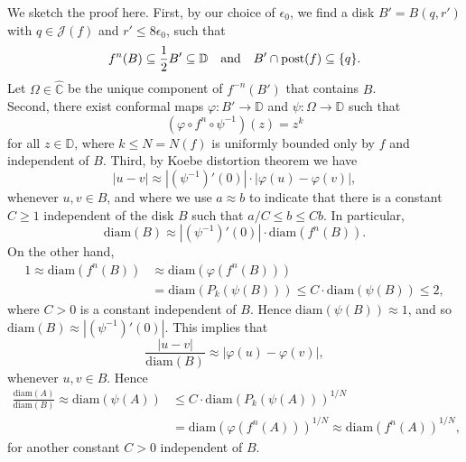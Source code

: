 \documentclass[12pt]{amsart}
\makeatletter
\newtheorem*{pf}{Proof}
\newcommand{\C}{\mathbb{C}}
\newcommand{\D}{\mathbb{D}}
\newcommand{\hC}{\widehat{\C}}
\newcommand{\sub}{\subseteq }
\newcommand{\J}{\mathcal{J}}
\newcommand{\co}{\colon}
\renewenvironment{pf}[1][\proofname]{%
  \par
  \pushQED{\qed}%
  \normalfont\topsep6\p@ \@plus6\p@ \trivlist
  \item[\hskip\labelsep\itshape
        \bfseries #1\@addpunct{:}]%
  \ignorespaces
}{%
  \popQED\endtrivlist
}
\makeatother
\begin{document}
\begin{pf}
We sketch the proof here. First, by our choice of $\epsilon_0$, 
we find a disk $B'=B(q,r')$ with $q\in \J(f)$ and $r'\leq 8\epsilon_0$, such that 
$$f^n(B)\sub \frac{1}{2}B'\sub \D \quad {\rm and} \quad B'\cap \mathrm{post}(f)\sub \{q\}.$$
Let $\Omega\in \hC$ be the unique component of $f^{-n}(B')$ that contains $B$.\\
Second, there exist conformal maps $\varphi\co B'\to \D$ and $\psi\co \Omega\to \D$ such that 
$$(\varphi\circ f^n\circ \psi^{-1})(z)=z^k$$
for all $z\in \D$, where $k\leq N=N(f)$ is uniformly bounded only by $f$ and independent of $B$. 
Third, 
by Koebe distortion theorem we have 
$$|u-v|\approx  \left\lvert (\psi^{-1})'(0)\right\rvert \cdot \left\lvert \varphi(u)-\varphi(v)\right\rvert, $$
whenever $u,v\in B$, and where we use $a\approx b$ to indicate that there is a constant $C\ge1$ independent of the disk $B$ such that $a/C\le b\le Cb$. In particular, 
$$\mathrm{diam}(B)\approx  \left\lvert (\psi^{-1})'(0)\right\rvert \cdot \mathrm{diam}(f^n(B)).$$
On the other hand, 
\begin{align*}
  1\approx  \mathrm{diam}(f^n(B))  &\approx  \mathrm{diam}(\varphi(f^n(B))) 
  \\& =\mathrm{diam}(P_k(\psi(B)))\le C\cdot \mathrm{diam}(\psi(B))\leq 2,
\end{align*}
where $C>0$ is a constant independent of $B$.
Hence $\mathrm{diam}(\psi(B))\approx  1$, and so $\mathrm{diam}(B)\approx \left\lvert (\psi^{-1})'(0)\right\rvert $.
This implies that 
$$\frac{|u-v|}{\mathrm{diam}(B)}\approx  \left\lvert \varphi(u)-\varphi(v)\right\rvert,$$
whenever $u,v\in B$. Hence
\begin{align*}
\frac{\mathrm{diam}(A)}{\mathrm{diam}(B)}\approx  \mathrm{diam}(\psi(A)) &\le C\cdot  \mathrm{diam}(P_k(\psi(A)))^{1/N}\\&=\mathrm{diam}(\varphi(f^n(A)))^{1/N}\approx  \mathrm{diam}(f^n(A))^{1/N},
\end{align*}
for another constant $C>0$ independent of $B$. 
\end{pf}
\end{document}
